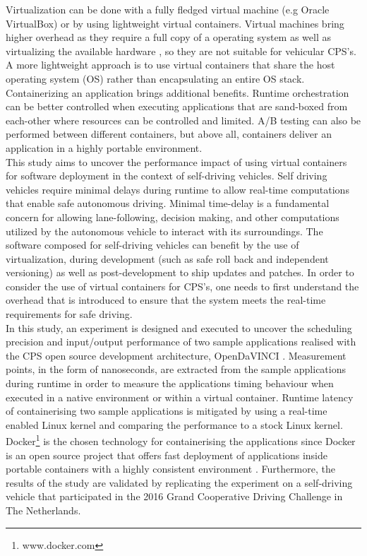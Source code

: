 Virtualization can be done with a fully fledged virtual machine (e.g Oracle VirtualBox) or by using lightweight virtual containers. Virtual machines bring higher overhead as they require a full copy of a operating system as well as virtualizing the available hardware \cite{anderson2015docker}, so they are not suitable for vehicular CPS's. A more lightweight approach is to use virtual containers that share the host operating system (OS) rather than encapsulating an entire OS stack. Containerizing an application brings additional benefits. Runtime orchestration can be better controlled when executing applications that are sand-boxed from each-other where resources can be controlled and limited. A/B testing can also be performed between different containers, but above all, containers deliver an application in a highly portable environment.\\

This study aims to uncover the performance impact of using virtual containers for software deployment in the context of self-driving vehicles. Self driving vehicles require minimal delays during runtime to allow real-time computations that enable safe autonomous driving. Minimal time-delay is a fundamental concern for allowing lane-following, decision making, and other computations utilized by the autonomous vehicle to interact with its surroundings. The software composed for self-driving vehicles can benefit by the use of virtualization, during development (such as safe roll back and independent versioning) as well as post-development to ship updates and patches. In order to consider the use of virtual containers for CPS's, one needs to first understand the overhead that is introduced to ensure that the system meets the real-time requirements for safe driving.\\

In this study, an experiment is designed and executed to uncover the scheduling precision and input/output performance of two sample applications realised with the CPS open source development architecture, OpenDaVINCI \cite{OpenDaVINCI}. Measurement points, in the form of nanoseconds, are extracted from the sample applications during runtime in order to measure the applications timing behaviour when executed in a native environment or within a virtual container. Runtime latency of containerising two sample applications is mitigated by using a real-time enabled Linux kernel and comparing the performance to a stock Linux kernel. Docker\footnote{www.docker.com} is the chosen technology for containerising the applications since Docker is an open source project that offers fast deployment of applications inside portable containers with a highly consistent environment \cite{bernstein2014containers}. Furthermore, the results of the study are validated by replicating the experiment on a self-driving vehicle that participated in the 2016 Grand Cooperative Driving Challenge in The Netherlands.

